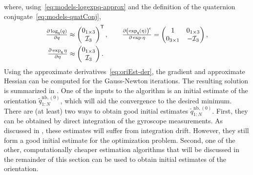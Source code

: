 where, using~\eqref{eq:models-logexpq-approx} and the definition of the quaternion conjugate~\eqref{eq:models-quatConj}, 
\begin{align}
\tfrac{\partial \log_\mathsf{q} (q)}{\partial q} &\approx \begin{pmatrix} 0_{1 \times 3} \\ \mathcal{I}_3 \end{pmatrix}^{\mathsf{T}}, \qquad
\tfrac{\partial \left( \exp_\mathsf{q} (\eta) \right)^{\mathsf{c}}}{\partial \exp \eta} = \begin{pmatrix} 1 & 0_{1 \times 3} \\ 0_{3 \times 1} & - \mathcal{I}_3 \end{pmatrix}, \nonumber \\
\tfrac{\partial \exp_\mathsf{q} \eta}{\partial \eta} &\approx \begin{pmatrix} 0_{1 \times 3} \\ \mathcal{I}_3 \end{pmatrix}.
\end{align}
Using the approximate derivatives~\eqref{eq:oriEst-der}, the gradient and approximate Hessian can be computed for the Gauss-Newton iterations. The resulting solution is summarized in . One of the inputs to the algorithm is an initial estimate of the orientation $\tilde{q}^{\text{nb},(0)}_{1:N}$, which will aid the convergence to the desired minimum. There are (at least) two ways to obtain good initial estimates $\tilde{q}^{\text{nb},(0)}_{1:N}$. First, they can be obtained by direct integration of the gyroscope measurements. As discussed in , these estimates will suffer from integration drift. However, they still form a good initial estimate for the optimization problem. Second, one of the other, computationally cheaper estimation algorithms that will be discussed in the remainder of this section can be used to obtain initial estimates of the orientation.


